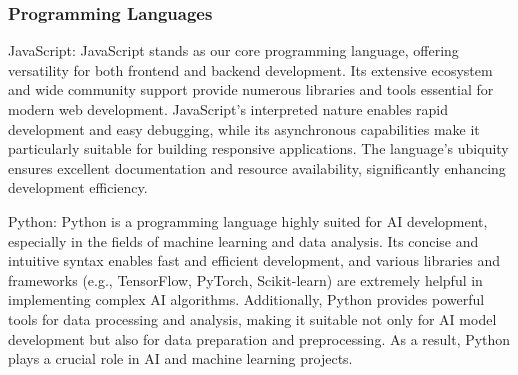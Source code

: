 \documentclass[conference]{IEEEtran}
\begin{document}
        \subsubsection{Programming Languages} 
            \begin{description}
                \item{JavaScript:}
                    JavaScript stands as our core programming language, offering versatility for both frontend and backend development. Its extensive ecosystem and wide community support provide numerous libraries and tools essential for modern web development. JavaScript's interpreted nature enables rapid development and easy debugging, while its asynchronous capabilities make it particularly suitable for building responsive applications. The language's ubiquity ensures excellent documentation and resource availability, significantly enhancing development efficiency.
                \item{Python:}
                    Python is a programming language highly suited for AI development, especially in the fields of machine learning and data analysis. Its concise and intuitive syntax enables fast and efficient development, and various libraries and frameworks (e.g., TensorFlow, PyTorch, Scikit-learn) are extremely helpful in implementing complex AI algorithms. Additionally, Python provides powerful tools for data processing and analysis, making it suitable not only for AI model development but also for data preparation and preprocessing. As a result, Python plays a crucial role in AI and machine learning projects.
            \end{description}
\end{document}
